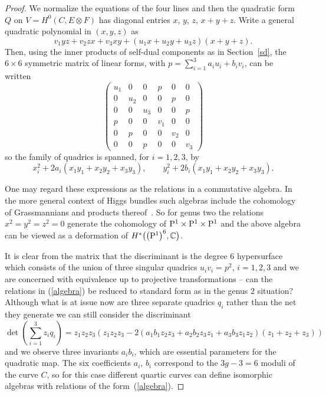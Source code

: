 \documentclass[pdftex]{sigma}
\numberwithin{equation}{section}
\begin{document}
\begin{proof}
We normalize the equations of the four lines and then the quadratic form $Q$ on $V=H^0(C,E\otimes F)$ has diagonal entries $x$, $y$, $z$, $x+y+z$.
 Write a general quadratic polynomial in $(x,y,z)$ as
 \[ v_1yz+v_2zx+v_3xy+(u_1x+u_2y+u_3z)(x+y+z).\]
Then, using the inner products of self-dual components as in Section~\ref{sd}, the $6\times 6$ symmetric matrix of linear forms, with $p=\sum_{i=1}^3 a_iu_i+b_iv_i$, can be written
 \[ \begin{pmatrix} u_1 & 0 & 0 & p & 0 & 0\\
 0 & u_2 & 0 & 0 & p & 0\\
 0 & 0 & u_3 & 0 & 0 & p\\
 p & 0 & 0 & v_1 & 0 & 0 \\
 0 & p & 0 & 0 & v_2 & 0\\
 0 & 0 & p & 0 & 0 & v_3\end{pmatrix}
 \]
so the family of quadrics is spanned, for $i=1,2,3$, by
\begin{equation}
x_i^2+2a_i(x_1y_1+x_2y_2+x_3y_3), \qquad y_i^2+2b_i(x_1y_1+x_2y_2+x_3y_3).
\label{algebra}
\end{equation}
\begin{Remark} One may regard these expressions as the relations in a commutative algebra. In the more general context of Higgs bundles such algebras include the cohomology of Grassmannians and products thereof~\cite{Hausel/Hitchin}. So for genus two the relations $x^2=y^2=z^2=0$ generate the cohomology of ${\rm P}^1\times {\rm P}^1\times {\rm P}^1$ and the above algebra can be viewed as a deformation of $H^*\big(\big({\rm P}^1\big)^6,{\mathbb C}\big)$.
\end{Remark}
 It is clear from the matrix that the discriminant is the degree $6$ hypersurface which consists of the union of three singular quadrics $u_iv_i=p^2$, $i=1,2,3$ and we are concerned with equivalence up to projective transformations -- can the relations in (\ref{algebra}) be reduced to standard form as in the genus $2$ situation? Although what is at issue now are three separate quadrics $q_i$ rather than the net they generate we can still consider the discriminant
\[ \det\left(\sum_{i=1}^3 z_i q_i\right)=z_1z_2z_3(z_1z_2z_3-2(a_1b_1z_2z_3+a_2b_2z_3z_1+a_3b_3 z_1z_2)(z_1+z_2+z_3))\]
 and we observe three invariants $a_ib_i$, which are essential parameters for the quadratic map. The six coefficients $a_i$, $b_i$ correspond to the $3g-3=6$ moduli of the curve $C$, so for this case different quartic curves can define isomorphic algebras with relations of the form~(\ref{algebra}).
 \end{proof}
\end{document}
